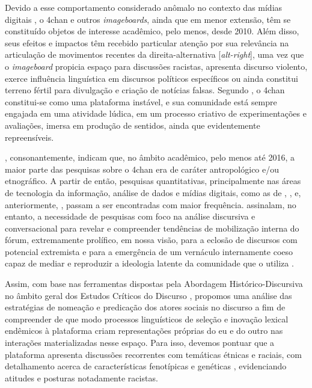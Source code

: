 \documentclass[portuguese]{textolivre}
\begin{document}
Devido a esse comportamento considerado anômalo no contexto das mídias digitais \cite{bernstein20114chan}, o 4chan e outros \emph{imageboards}, ainda que em menor extensão, têm se constituído objetos de interesse acadêmico, pelo menos, desde 2010. Além disso,  seus efeitos e impactos têm recebido particular atenção por sua relevância na articulação de movimentos recentes da direita-alternativa [\emph{alt-right}], uma vez que o \emph{imageboard} propicia espaço para discussões racistas, apresenta discurso violento, exerce influência linguística em discursos políticos específicos ou ainda constitui terreno fértil para divulgação e criação de notícias falsas. Segundo \textcite{saklofske2011using}, o 4chan  constitui-se como uma plataforma instável, e sua comunidade está sempre engajada em uma atividade lúdica, em um processo criativo de experimentações e avaliações, imersa em produção de sentidos, ainda que evidentemente repreensíveis.

\textcite{colley2022challenges}, consonantemente, indicam que, no âmbito acadêmico, pelo menos até 2016, a maior parte das pesquisas sobre o 4chan era de caráter antropológico e/ou etnográfico. A partir de então, pesquisas quantitativas, principalmente nas áreas de tecnologia da informação, análise de dados e mídias digitais, como as de \textcite{tutershagen2020they}, \textcite{mittos2020analyzing}, \textcite{baele2021variations} e, anteriormente, \textcite{bernstein20114chan}, passam a ser encontradas com maior frequência. \textcite{colley2022challenges} assinalam, no entanto, a necessidade de pesquisas com foco na análise discursiva e conversacional para revelar e compreender tendências de mobilização interna do fórum, extremamente prolífico, em nossa visão, para a eclosão de discursos com potencial extremista e para a emergência de um vernáculo internamente coeso capaz de mediar e reproduzir a ideologia latente da comunidade que o utiliza \cite{wodakreisigl2016}.

Assim, com base nas ferramentas dispostas pela Abordagem Histórico-Discursiva \cite{wodakreisigl2016} no âmbito geral dos Estudos Críticos do Discurso \cite{wodameyer2016}, propomos uma análise das estratégias de nomeação e predicação dos atores sociais no discurso a fim de compreender de que modo processos linguísticos de seleção e inovação lexical endêmicos à plataforma criam representações próprias do eu e do outro nas interações materializadas nesse espaço. Para isso, devemos pontuar que a plataforma apresenta discussões recorrentes com temáticas étnicas e raciais, com detalhamento acerca de características fenotípicas e genéticas \cite{baele2021variations, mittos2020analyzing}, evidenciando atitudes e posturas notadamente racistas.
\end{document}
